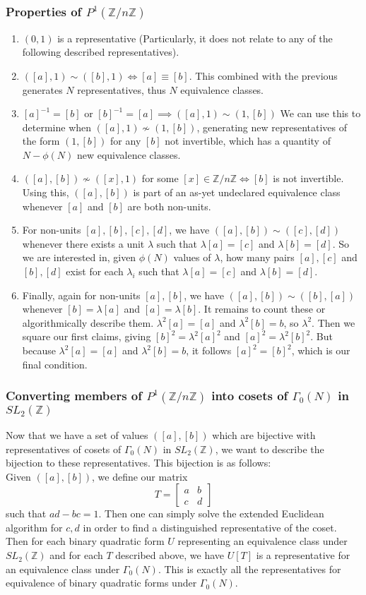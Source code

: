 \documentclass[11pt, oneside]{amsart}
\begin{document}
\subsubsection{Properties of $P^1(\mathbb{Z}/ n \mathbb{Z})$}
\begin{enumerate}
\item $(0,1)$ is a representative (Particularly, it does not relate to any of the following described representatives).
\item $([a],1)\sim ([b],1) \iff [a] \equiv [b]$. This combined with the previous generates $N$ representatives, thus $N$ equivalence classes.
\item $[a]^{-1} = [b]$ or $[b]^{-1}=[a] \implies ([a],1)\sim (1,[b])$ We can use this to determine when $([a],1)\not\sim (1,[b])$, generating new representatives of the form $(1,[b])$ for any $[b]$ not invertible, which has a quantity of $N-\phi(N)$ new equivalence classes.
\item $([a],[b]) \not\sim  ([x], 1)$ for some $[x]\in\mathbb{Z}/n \mathbb{Z} \iff [b]$ is not invertible. Using this, $([a],[b])$ is part of an as-yet undeclared equivalence class whenever $[a]$ and $[b]$ are both non-units.
\item For non-units $[a],[b],[c],[d]$, we have $([a],[b])\sim([c],[d])$ whenever there exists a unit $\lambda$ such that $\lambda[a]=[c]$ and $\lambda[b]=[d]$. So we are interested in, given $\phi(N)$ values of $\lambda$, how many pairs $[a],[c]$ and $[b],[d]$ exist for each $\lambda_i$ such that $\lambda[a]=[c]$ and $\lambda[b]=[d]$.
\item Finally, again for non-units $[a],[b]$, we have $([a],[b])\sim ([b],[a])$ whenever $[b]=\lambda [a]$ and $[a]=\lambda [b]$. It remains to count these or algorithmically describe them. $\lambda^2[a]=[a]$ and $\lambda^2 [b] =b$, so $\lambda^2$. Then we square our first claims, giving $[b]^2=\lambda^2[a]^2$ and $[a]^2=\lambda^2[b]^2$. But because $\lambda^2[a]=[a]$ and $\lambda^2 [b] =b$, it follows $[a]^2=[b]^2$, which is our final condition.
\end{enumerate}
\subsubsection{Converting members of $P^1(\mathbb{Z}/ n \mathbb{Z})$ into cosets of $\Gamma_0(N)$ in $SL_2(\mathbb{Z})$}
Now that we have a set of values $([a],[b])$ which are bijective with representatives of cosets of $\Gamma_0(N)$ in $SL_2(\mathbb{Z})$, we want to describe the bijection to these representatives. This bijection is as follows:\\
Given $([a],[b])$, we define our matrix \[T=\left[\begin{matrix}
a & b\\
c & d
\end{matrix}\right]
\] such that $ad-bc=1$. Then one can simply solve the extended Euclidean algorithm for $c,d$ in order to find a distinguished representative of the coset. Then for each binary quadratic form $U$ representing an equivalence class under $SL_2(\mathbb{Z})$ and for each $T$ described above, we have $U[T]$ is a representative for an equivalence class under $\Gamma_0(N)$.
This is exactly all the representatives for equivalence of binary quadratic forms under $\Gamma_0(N)$.
\end{document}
